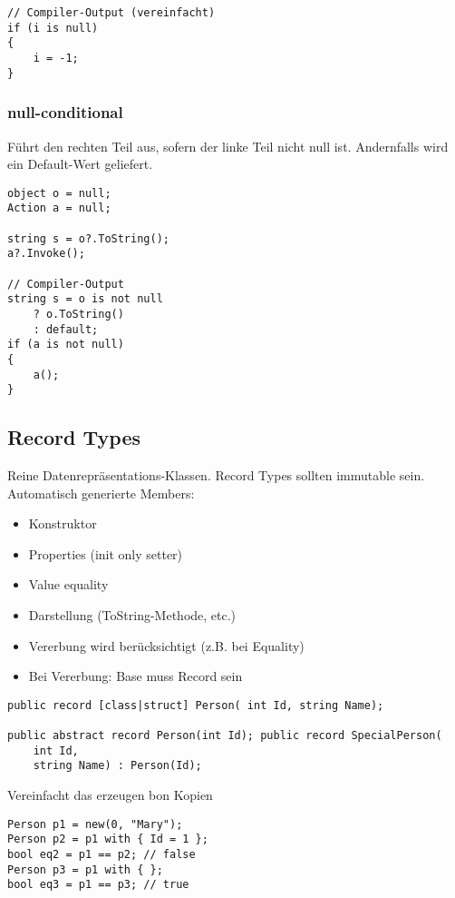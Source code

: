 \begin{multicols*}{2}
\begin{lstlisting}
// Compiler-Output (vereinfacht)
if (i is null)
{
    i = -1; 
}
\end{lstlisting}
\subsubsection{null-conditional}
Führt den rechten Teil aus, sofern der linke Teil nicht null ist. Andernfalls wird ein Default-Wert geliefert.
\begin{lstlisting}
object o = null; 
Action a = null;

string s = o?.ToString();
a?.Invoke();

// Compiler-Output
string s = o is not null
    ? o.ToString()
    : default;
if (a is not null)
{
    a(); 
}
\end{lstlisting}

\subsection{Record Types}
Reine Datenrepräsentations-Klassen. Record Types sollten immutable sein. Automatisch generierte Members:
\begin{itemize}
    \item Konstruktor
    \item Properties (init only setter)
    \item Value equality
    \item Darstellung (ToString-Methode, etc.)
    \item Vererbung wird berücksichtigt (z.B. bei Equality)
    \item Bei Vererbung: Base muss Record sein
\end{itemize}
\begin{lstlisting}
public record [class|struct] Person( int Id, string Name);

public abstract record Person(int Id); public record SpecialPerson(
    int Id,
    string Name) : Person(Id);
\end{lstlisting}
Vereinfacht das erzeugen bon Kopien
\begin{lstlisting}
Person p1 = new(0, "Mary");
Person p2 = p1 with { Id = 1 };
bool eq2 = p1 == p2; // false
Person p3 = p1 with { };
bool eq3 = p1 == p3; // true
\end{lstlisting}
\end{multicols*}